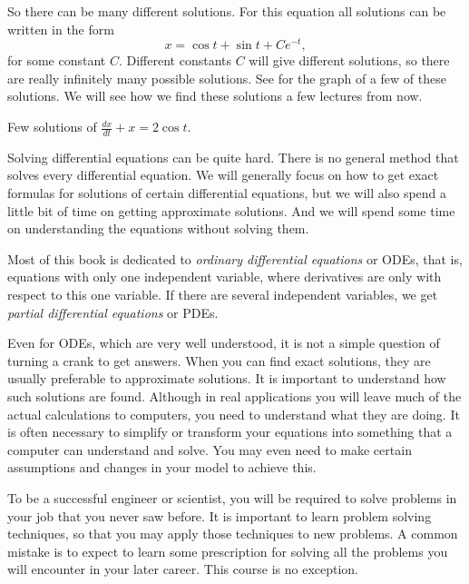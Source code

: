 So there can be many different solutions.  For this equation all
solutions can be written in the form
\begin{equation*}
x = \cos t + \sin t + C e^{-t} ,
\end{equation*}
for some constant $C$.  Different constants $C$ will give different
solutions, so there are really infinitely many possible solutions.
See  for the graph of a
few of these solutions. 
We will see how we find these solutions
a few lectures from now.

\medskip

\begin{mywrapfig}{3.25in}
\capstart
{}
\caption{Few solutions of $\frac{dx}{dt} + x = 2 \cos t$.\label{intro:plotsfig}}
\end{mywrapfig}%


Solving differential equations can be quite hard.  
There is no general method that solves every differential equation.  We will
generally focus on how to get exact formulas for solutions of certain
differential
equations, but we will also spend a little bit of time
on getting approximate solutions.
And we will spend some time on understanding the equations without solving
them.

Most of this book is dedicated to
\emph{ordinary differential equations}
or ODEs, that is, equations with
only one independent variable, where derivatives are only with respect to
this one variable.
If there are several independent variables, we get
\emph{partial differential equations}
or PDEs.

Even for ODEs, which are very well understood, it is not a simple question
of turning a crank to get answers.  
When you can find exact solutions, they are usually preferable to 
approximate solutions.  It is important to understand how
such solutions are found.
Although in real applications you will
leave much of the actual calculations to computers, you
need to understand what they are doing.  It is often necessary
to simplify or transform your equations into something that a computer can
understand and solve.
You may even need to make certain assumptions and changes in your
model to achieve this.

To be a successful engineer or scientist, you will be required to solve
problems in your job that you never saw before.  It is important to
learn problem solving techniques, so that you may apply those techniques to
new problems.  A common mistake is to expect to learn some prescription for
solving all the problems you will encounter in your later career.  This
course is no exception.

